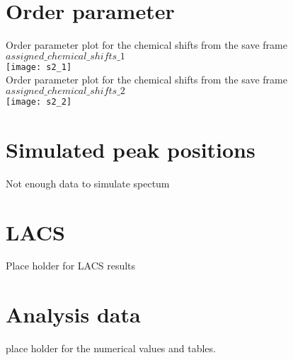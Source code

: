 \section{Order parameter}
Order parameter plot for the chemical shifts from the  save frame $assigned\_chemical\_shifts\_1$\\ \texttt{[image: s2\_1]}\\
Order parameter plot for the chemical shifts from the  save frame $assigned\_chemical\_shifts\_2$\\ \texttt{[image: s2\_2]}\\

\section{Simulated peak positions}
Not enough data to simulate spectum\\
\section{LACS}
Place holder for LACS results
\section{Analysis data}
place holder for the numerical values and tables.
